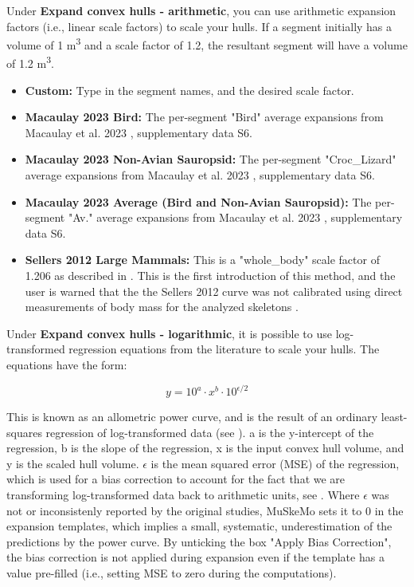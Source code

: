 \documentclass{article}
\begin{document}
Under \textbf{Expand convex hulls - arithmetic}, you can use arithmetic expansion factors (i.e., linear scale factors) to scale your hulls. If a segment initially has a volume of 1 \si{m^3} and a scale factor of 1.2, the resultant segment will have a volume of 1.2 \si{m^3}. 

\begin{itemize}
    \item \textbf{Custom:} Type in the segment names, and the desired scale factor.
    \item \textbf{Macaulay 2023 Bird:} The per-segment "Bird" average expansions from Macaulay et al. 2023 \cite{macaulayDecouplingBodyShape2023}, supplementary data S6.
    \item \textbf{Macaulay 2023 Non-Avian Sauropsid:} The per-segment "Croc\_Lizard" average expansions from Macaulay et al. 2023 \cite{macaulayDecouplingBodyShape2023}, supplementary data S6.
    \item \textbf{Macaulay 2023 Average (Bird and Non-Avian Sauropsid):} The per-segment "Av." average expansions from Macaulay et al. 2023 \cite{macaulayDecouplingBodyShape2023}, supplementary data S6.
    \item \textbf{Sellers 2012 Large Mammals:} This is a "whole\_body" scale factor of 1.206 as described in \cite{sellersMinimumConvexHull2012a}. This is the first introduction of this method, and the user is warned that the the Sellers 2012 curve was not calibrated using direct measurements of body mass for the analyzed skeletons \cite{sellersMinimumConvexHull2012a}.
\end{itemize}

Under \textbf{Expand convex hulls - logarithmic}, it is possible to use log-transformed regression equations from the literature to scale your hulls. 
The equations have the form:

\begin{equation}
y = 10^a \cdot x^{b} \cdot 10^{\epsilon /2}
\label{eq:powercurve}
\end{equation}


This is known as an allometric power curve, and is the result of an ordinary least-squares regression of log-transformed data (see \cite{alexanderPrinciplesAnimalLocomotion2006,brasseyScalingConvexHull2014}). a is the y-intercept of the regression, b is the slope of the regression, x is the input convex hull volume, and y is the scaled hull volume.  \(\epsilon\) is the mean squared error (MSE) of the regression, which is used for a bias correction to account for the fact that we are transforming log-transformed data back to arithmetic units, see \cite{baskervilleUseLogarithmicRegression1972,newmanRegressionAnalysisLogtransformed1993}. Where \(\epsilon\) was not or inconsistenly reported by the original studies, MuSkeMo sets it to 0 in the expansion templates, which implies a small, systematic, underestimation of the predictions by the power curve. By unticking the box "Apply Bias Correction", the bias correction is not applied during expansion even if the template has a value pre-filled (i.e., setting MSE to zero during the computations).
\end{document}
